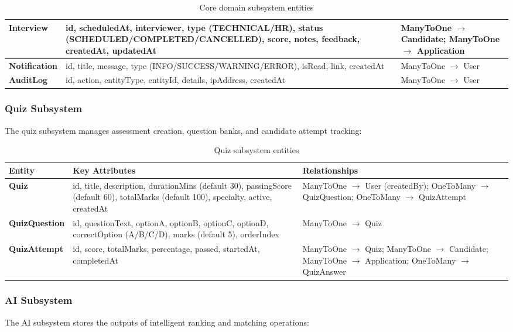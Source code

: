\begin{table}[H]
\begin{tabular}{|p{2.5cm}|p{4cm}|p{6.5cm}|}
\hline
\textbf{Interview} & id, scheduledAt, interviewer, type (TECHNICAL/HR), status (SCHEDULED/COMPLETED/CANCELLED), score, notes, feedback, createdAt, updatedAt & ManyToOne $\rightarrow$ Candidate; ManyToOne $\rightarrow$ Application \\
\hline
\textbf{Notification} & id, title, message, type (INFO/SUCCESS/WARNING/ERROR), isRead, link, createdAt & ManyToOne $\rightarrow$ User \\
\hline
\textbf{AuditLog} & id, action, entityType, entityId, details, ipAddress, createdAt & ManyToOne $\rightarrow$ User \\
\hline
\end{tabular}
\caption{Core domain subsystem entities}
\end{table}

\subsubsection{Quiz Subsystem}
The quiz subsystem manages assessment creation, question banks, and candidate attempt tracking:

\begin{table}[H]
\centering
\small
\begin{tabular}{|p{2.5cm}|p{4cm}|p{6.5cm}|}
\hline
\rowcolor{gray!20}
\textbf{Entity} & \textbf{Key Attributes} & \textbf{Relationships} \\
\hline
\textbf{Quiz} & id, title, description, durationMins (default 30), passingScore (default 60), totalMarks (default 100), specialty, active, createdAt & ManyToOne $\rightarrow$ User (createdBy); OneToMany $\rightarrow$ QuizQuestion; OneToMany $\rightarrow$ QuizAttempt \\
\hline
\textbf{QuizQuestion} & id, questionText, optionA, optionB, optionC, optionD, correctOption (A/B/C/D), marks (default 5), orderIndex & ManyToOne $\rightarrow$ Quiz \\
\hline
\textbf{QuizAttempt} & id, score, totalMarks, percentage, passed, startedAt, completedAt & ManyToOne $\rightarrow$ Quiz; ManyToOne $\rightarrow$ Candidate; ManyToOne $\rightarrow$ Application; OneToMany $\rightarrow$ QuizAnswer \\
\hline
\end{tabular}
\caption{Quiz subsystem entities}
\end{table}

\subsubsection{AI Subsystem}
The AI subsystem stores the outputs of intelligent ranking and matching operations:

